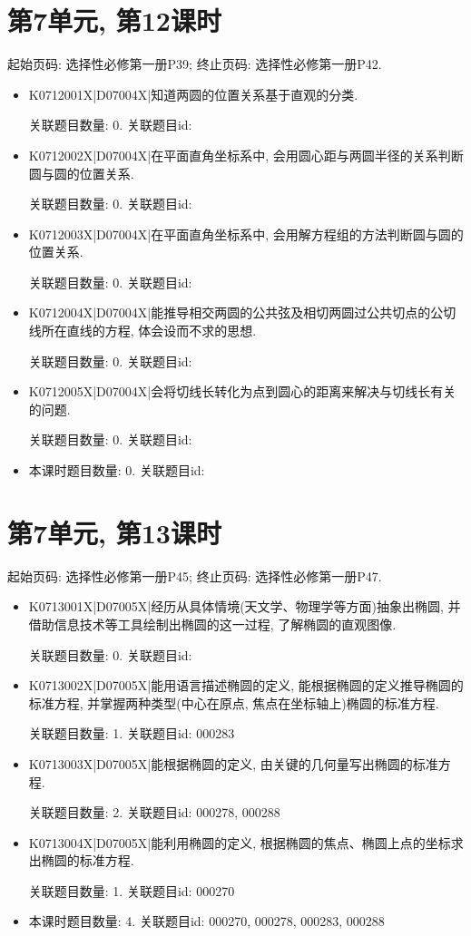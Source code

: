 \section*{第7单元, 第12课时}
起始页码: 选择性必修第一册P39; 终止页码: 选择性必修第一册P42.
\begin{itemize}
\item K0712001X|D07004X|知道两圆的位置关系基于直观的分类.

关联题目数量: 0. 关联题目id: 

\item K0712002X|D07004X|在平面直角坐标系中, 会用圆心距与两圆半径的关系判断圆与圆的位置关系.

关联题目数量: 0. 关联题目id: 

\item K0712003X|D07004X|在平面直角坐标系中, 会用解方程组的方法判断圆与圆的位置关系.

关联题目数量: 0. 关联题目id: 

\item K0712004X|D07004X|能推导相交两圆的公共弦及相切两圆过公共切点的公切线所在直线的方程, 体会设而不求的思想.

关联题目数量: 0. 关联题目id: 

\item K0712005X|D07004X|会将切线长转化为点到圆心的距离来解决与切线长有关的问题.

关联题目数量: 0. 关联题目id: 

\item 本课时题目数量: 0. 关联题目id: 

\end{itemize}

\section*{第7单元, 第13课时}
起始页码: 选择性必修第一册P45; 终止页码: 选择性必修第一册P47.
\begin{itemize}
\item K0713001X|D07005X|经历从具体情境(天文学、物理学等方面)抽象出椭圆, 并借助信息技术等工具绘制出椭圆的这一过程, 了解椭圆的直观图像.

关联题目数量: 0. 关联题目id: 

\item K0713002X|D07005X|能用语言描述椭圆的定义, 能根据椭圆的定义推导椭圆的标准方程, 并掌握两种类型(中心在原点, 焦点在坐标轴上)椭圆的标准方程.

关联题目数量: 1. 关联题目id: 000283

\item K0713003X|D07005X|能根据椭圆的定义, 由关键的几何量写出椭圆的标准方程.

关联题目数量: 2. 关联题目id: 000278, 000288

\item K0713004X|D07005X|能利用椭圆的定义, 根据椭圆的焦点、椭圆上点的坐标求出椭圆的标准方程.

关联题目数量: 1. 关联题目id: 000270

\item 本课时题目数量: 4. 关联题目id: 000270, 000278, 000283, 000288

\end{itemize}

